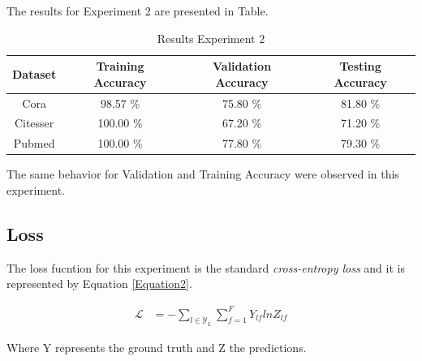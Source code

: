 The results for Experiment 2 are presented in Table.

\begin {table}[ht]
\caption {Results Experiment 2} \label{tab:results2} 
  \begin{center}
    \begin{tabular}{|c|c|c|c|}
    \hline
    Dataset    &  Training Accuracy & Validation Accuracy & Testing Accuracy\\ \hline
    Cora          & 98.57 \% & 75.80 \%  & 81.80 \% \\ 
    Citesser      & 100.00 \%& 67.20 \%  & 71.20 \% \\
    Pubmed        & 100.00 \%& 77.80 \%  & 79.30 \% \\
    \hline
    \end{tabular}
  \end{center}
\end{table}

The same behavior for Validation and Training Accuracy were observed in this experiment.

\subsection{Loss}

The loss fucntion for this experiment is the standard \textit{cross-entropy loss} and it is represented by Equation \ref{Equation2}.

\begin{align*}
  \mathcal{L} &= - \sum_{l \in \mathcal{Y}_{L}} \sum_{f=1}^{F} Y_{lf}lnZ_{lf}  
\end{align*}\label{Equation2}

Where Y represents the ground truth and Z the predictions.

